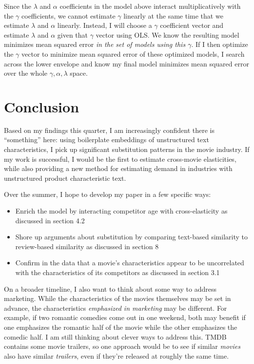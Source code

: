 \documentclass{article}
\begin{document}
Since the $\lambda$ and $\alpha$ coefficients in the model above interact multiplicatively with the $\gamma$ coefficients, we cannot estimate $\gamma$ linearly at the same time that we estimate $\lambda$ and $\alpha$ linearly. Instead, I will choose a $\gamma$ coefficient vector and estimate $\lambda$ and $\alpha$ given that $\gamma$ vector using OLS. We know the resulting model minimizes mean squared error \emph{in the set of models using this $\gamma$}. If I then optimize the $\gamma$ vector to minimize mean squared error of these optimized models, I search across the lower envelope and know my final model minimizes mean squared error over the whole $\gamma, \alpha, \lambda$ space.





\section{Conclusion}

Based on my findings this quarter, I am increasingly confident there is ``something'' here: using boilerplate embeddings of unstructured text characteristics, I pick up significant substitution patterns in the movie industry. If my work is successful, I would be the first to estimate cross-movie elasticities, while also providing a new method for estimating demand in industries with unstructured product characteristic text.

Over the summer, I hope to develop my paper in a few specific ways:
\begin{itemize}
    \item Enrich the model by interacting competitor age with cross-elasticity as discussed in section 4.2
    \item Shore up arguments about substitution by comparing text-based similarity to review-based similarity as discussed in section 8
    \item Confirm in the data that a movie's characteristics appear to be uncorrelated with the characteristics of its competitors as discussed in section 3.1
\end{itemize}

On a broader timeline, I also want to think about some way to address marketing. While the characteristics of the movies themselves may be set in advance, the characteristics \emph{emphasized in marketing} may be different. For example, if two romantic comedies come out in one weekend, both may benefit if one emphasizes the romantic half of the movie while the other emphasizes the comedic half. I am still thinking about clever ways to address this. TMDB contains some movie trailers, so one approach would be to see if similar \emph{movies} also have similar \emph{trailers}, even if they're released at roughly the same time. 

\printbibliography
\end{document}
